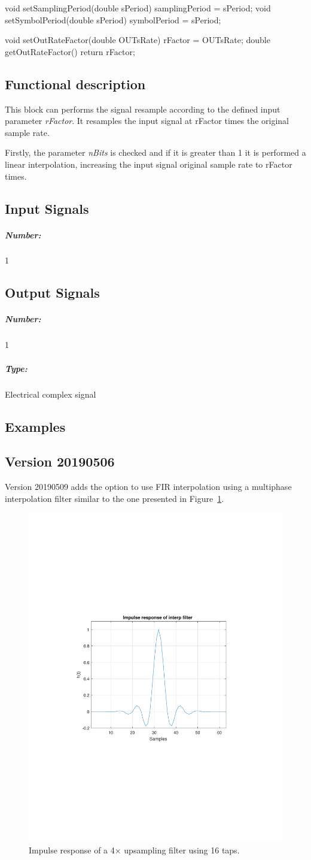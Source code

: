 void setSamplingPeriod(double sPeriod) { samplingPeriod = sPeriod; }
void setSymbolPeriod(double sPeriod) { symbolPeriod = sPeriod; }

void setOutRateFactor(double OUTsRate) { rFactor = OUTsRate; }
double getOutRateFactor() { return rFactor; }

\subsection*{Functional description}

This block can performs the signal resample according to the defined input parameter \textit{rFactor}. It resamples the input signal at rFactor times the original sample rate.

Firstly, the parameter \textit{nBits} is checked and if it is greater than 1 it is performed a linear interpolation, increasing the input signal original sample rate to rFactor times.


\pagebreak
\subsection*{Input Signals}

\subparagraph*{Number:} 1

\subsection*{Output Signals}

\subparagraph*{Number:} 1

\subparagraph*{Type:} Electrical complex signal

\subsection*{Examples}

\subsection*{Version 20190506}

Version 20190509 adds the option to use FIR interpolation using a multiphase interpolation filter similar to the one presented in Figure~\ref{fig:FILTER}.

\begin{figure}[h]
\centering
\includegraphics[trim={7cm 8cm 7cm 8cm},width=.3\linewidth]{./lib/resample/figures/FILTER}
\caption{Impulse response of a 4$\times$ upsampling filter using 16 taps.}
\label{fig:FILTER}
\end{figure}	

